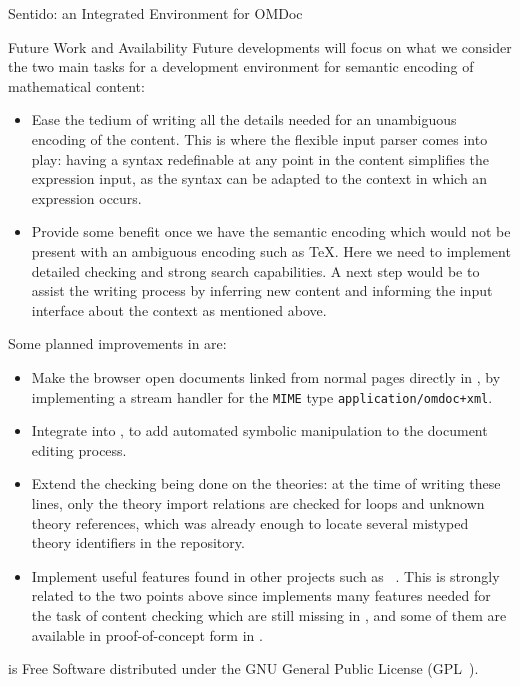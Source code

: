 \begin{omgroup}[id=sentido,short=Sentido Integrated Environment,
            creators=alberto]{Sentido: an Integrated Environment for OMDoc}
\begin{omgroup}{Future Work and Availability}
Future developments will focus on what we consider the two main tasks for a development
environment for semantic encoding of mathematical content:
\begin{itemize}
\item Ease the tedium of writing all the details needed for an unambiguous encoding of the
  content.  This is where the flexible input parser comes into play: having a syntax
  redefinable at any point in the content simplifies the expression input, as the syntax
  can be adapted to the context in which an expression occurs.
\item Provide some benefit once we have the semantic encoding which would not be present
  with an ambiguous encoding such as {\TeX}.  Here we need to implement detailed checking
  and strong search capabilities.  A next step would be to assist the writing process by
  inferring new content and informing the input interface about the context as mentioned
  above.
\end{itemize}

Some planned improvements in {\sentido} are:
\begin{itemize}
\item Make the browser open {\omdoc} documents linked from normal pages directly in
  {\sentido}, by implementing a stream handler for the {\tt{MIME}} type
  {\tt{application/omdoc+xml}}.
\item Integrate {\algebra} into {\sentido}, to add automated symbolic manipulation to the
  document editing process.
\item Extend the checking being done on the theories: at the time of writing these lines,
  only the theory import relations are checked for loops and unknown theory references,
  which was already enough to locate several mistyped theory identifiers in the {\omdoc}
  repository.
\item Implement useful features found in other projects such as
  {\theorema}~\cite{piroi04environment}.  This is strongly related to the two points above
  since {\theorema} implements many features needed for the task of content checking which
  are still missing in {\sentido}, and some of them are available in proof-of-concept form
  in {\algebra}.
\end{itemize}

{\sentido} is Free Software distributed under the GNU General Public License
(GPL~\cite{GPL}).
\end{omgroup}
\end{omgroup}


